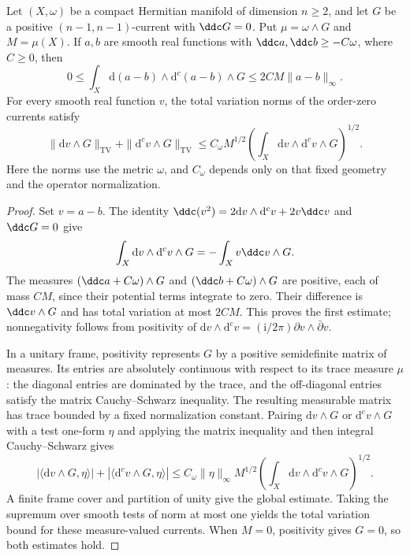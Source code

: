 \begin{lemma}\label{lem:pluriharmonic-gradient-energy}
Let $(X,\omega)$ be a compact Hermitian manifold of dimension $n\geq2$, and let $G$ be a positive $(n-1,n-1)$-current with $\ddc G=0$. Put $\mu=\omega\wedge G$ and $M=\mu(X)$. If $a,b$ are smooth real functions with $\ddc a,\ddc b\geq-C\omega$, where $C\geq0$, then
\[
 0\leq\int_X\mathrm{d}(a-b)\wedge\mathrm{d}^c(a-b)\wedge G
 \leq2C M\|a-b\|_\infty.
\]
For every smooth real function $v$, the total variation norms of the order-zero currents satisfy
\[
 \|\mathrm{d}v\wedge G\|_{\mathrm{TV}}+
 \|\mathrm{d}^cv\wedge G\|_{\mathrm{TV}}
 \leq C_\omega M^{1/2}
       \left(\int_X\mathrm{d}v\wedge\mathrm{d}^cv\wedge G\right)^{1/2}.
\]
Here the norms use the metric $\omega$, and $C_\omega$ depends only on that fixed geometry and the operator normalization.
\end{lemma}
\begin{proof}
Set $v=a-b$. The identity $\ddc(v^2)=2\mathrm{d}v\wedge\mathrm{d}^cv+2v\ddc v$ and $\ddc G=0$ give
\[
 \int_X\mathrm{d}v\wedge\mathrm{d}^cv\wedge G
 =-\int_Xv\ddc v\wedge G.
\]
The measures $(\ddc a+C\omega)\wedge G$ and $(\ddc b+C\omega)\wedge G$ are positive, each of mass $CM$, since their potential terms integrate to zero. Their difference is $\ddc v\wedge G$ and has total variation at most $2CM$. This proves the first estimate; nonnegativity follows from positivity of $\mathrm{d}v\wedge\mathrm{d}^cv=(\mathrm{i}/2\pi)\partial v\wedge\bar\partial v$.

In a unitary frame, positivity represents $G$ by a positive semidefinite matrix of measures. Its entries are absolutely continuous with respect to its trace measure $\mu$: the diagonal entries are dominated by the trace, and the off-diagonal entries satisfy the matrix Cauchy--Schwarz inequality. The resulting measurable matrix has trace bounded by a fixed normalization constant. Pairing $\mathrm{d}v\wedge G$ or $\mathrm{d}^cv\wedge G$ with a test one-form $\eta$ and applying the matrix inequality and then integral Cauchy--Schwarz gives
\[
 |\langle\mathrm{d}v\wedge G,\eta\rangle|
 +|\langle\mathrm{d}^cv\wedge G,\eta\rangle|
 \leq C_\omega\|\eta\|_\infty M^{1/2}
 \left(\int_X\mathrm{d}v\wedge\mathrm{d}^cv\wedge G\right)^{1/2}.
\]
A finite frame cover and partition of unity give the global estimate. Taking the supremum over smooth tests of norm at most one yields the total variation bound for these measure-valued currents. When $M=0$, positivity gives $G=0$, so both estimates hold.
\end{proof}


